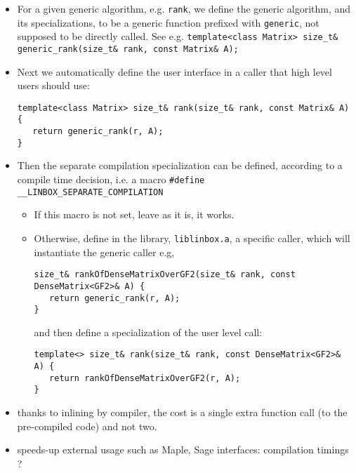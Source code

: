 \documentclass[runningheads,a4paper]{llncs}
\begin{document}
\begin{itemize}
\item For a given generic algorithm, e.g. \verb!rank!, we define the
  generic algorithm, and its specializations, to be a generic function
  prefixed with \verb!generic!, not supposed to be directly called. See e.g. 
\verb!template<class Matrix> size_t& generic_rank(size_t& rank, const Matrix& A);!
\item Next we automatically define the user interface in a caller that
  high level users should use:
\begin{verbatim}
template<class Matrix> size_t& rank(size_t& rank, const Matrix& A) {
   return generic_rank(r, A);
}
\end{verbatim}
\item Then the separate compilation specialization can be defined,
  according to a compile time decision, i.e. a macro 
\verb!#define __LINBOX_SEPARATE_COMPILATION!
\begin{itemize}
\item If this macro is not set, leave as it is, it works.
\item Otherwise, define in the library, \verb!liblinbox.a!, 
a specific caller, which will instantiate the generic caller e.g,
\begin{verbatim}
size_t& rankOfDenseMatrixOverGF2(size_t& rank, const DenseMatrix<GF2>& A) {
   return generic_rank(r, A);
}
\end{verbatim}
and then define a specialization of the user level call:
\begin{verbatim}
template<> size_t& rank(size_t& rank, const DenseMatrix<GF2>& A) {
   return rankOfDenseMatrixOverGF2(r, A);
}
\end{verbatim}
\end{itemize}
\end{itemize}

\begin{itemize}
\item thanks to inlining by compiler, the cost is a single extra
  function call (to the pre-compiled code) and not two.
\item speeds-up external usage such as Maple, Sage interfaces:
  compilation timings ?
\end{itemize}


 
\end{document}
